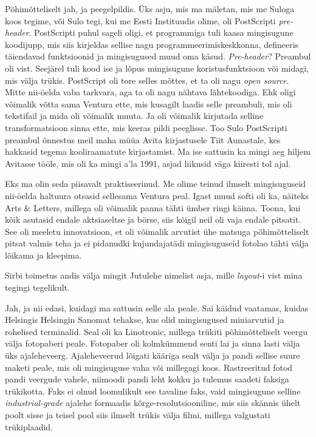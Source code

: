 Põhimõtteliselt jah, ja peegelpildis. Üks asju, mis ma mäletan, mis me 
Suloga koos tegime, või Sulo tegi, kui me Eesti 
Instituudis olime, oli PostScripti \emph{pre-header}. 
PostScripti puhul sageli oligi, et programmiga tuli kaasa mingisugune 
koodijupp, mis siis kirjeldas sellise nagu programmeerimiskeskkonna, defineeris 
täiendavad funktsioonid ja mingisugused muud oma käsud. \emph{Pre-header}? 
Preambul oli vist. Seejärel tuli  kood ise ja lõpus mingisugune 
koristusfunktsioon või midagi, mis välja trükis. PostScript oli tore selles 
mõttes, et ta oli nagu \emph{open source}. Mitte nii-öelda vaba tarkvara, aga 
ta oli nagu nähtava lähtekoodiga. Ehk oligi võimalik võtta sama Ventura ette, 
mis kusagilt laadis selle preambuli, mis oli tekstifail ja mida oli võimalik 
muuta. Ja oli võimalik kirjutada selline transformatsioon sinna ette, mis 
keeras pildi peeglisse. Too Sulo PostScripti preambul õnnestus meil maha müüa 
Avita kirjastusele Tiit Aunastale, kes hakkasid tegema kooliraamatute kirjastamist. Ma ise sattusin ka  
mingi aeg hiljem  Avitasse tööle, mis oli ka mingi a'la 1991, asjad liikusid 
väga kiiresti tol ajal.


Eks ma olin seda piisavalt praktiseerinud. Me olime teinud ilmselt 
mingisuguseid nii-öelda haltuura otsasid sellesama Ventura peal. Igast muud 
softi oli ka, näiteks Arts \& Letters, millega oli võimalik panna tähti ümber 
ringi käima. Toona, kui kõik asutasid endale aktsiaseltse ja börse, siis kõigil 
neil oli vaja endale pitsatit. See oli meeletu innovatsioon, et oli võimalik 
arvutist ühe matsuga põhimõtteliselt pitsat valmis teha ja ei pidanudki 
kujundajatädi mingisuguseid fotolao tähti välja lõikama ja kleepima. 

Sirbi  toimetus andis välja mingit Jutulehe nimelist asja, mille  \emph{layout}-i vist mina tegingi 
tegelikult. 

Jah, ja nii edasi, kuidagi ma sattusin selle ala peale. Sai käidud vaatamas, 
kuidas Helsingis Helsingin Sanomat tehakse, kus olid 
mingisugused miniarvutid ja   rohelised terminalid. Seal oli ka 
Linotronic, millega trükiti põhimõtteliselt veergu välja 
fotopaberi peale. Fotopaber oli kolmkümmend senti lai ja sinna lasti välja  üks 
ajaleheveerg. Ajaleheveerud lõigati kääriga sealt välja ja pandi sellise suure 
maketi peale, mis oli mingisuguse vaha või millegagi koos. Rastreeritud fotod 
pandi veergude vahele, niimoodi pandi leht kokku ja tulemus saadeti faksiga 
trükikotta. Faks ei olnud loomulikult see tavaline faks, vaid mingisugune 
selline \emph{industrial-grade} ajalehe formaadis kõrge-resolutsiooniline,  mis 
siis  skännis ühelt poolt sisse ja teisel pool siis  ilmselt trükis välja 
filmi, millega valgustati trükiplaadid. 

